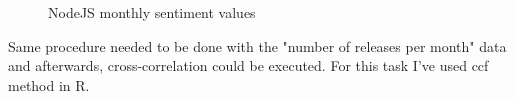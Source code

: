 \begin{figure}%
    \centering
    \qquad
    \caption{NodeJS monthly sentiment values}%
    \label{fig:NodeJS_Sentiment_before_after}%
\end{figure}

Same procedure needed to be done with the "number of releases per month" data and afterwards, cross-correlation could be executed. For this task I've used ccf method in R. 